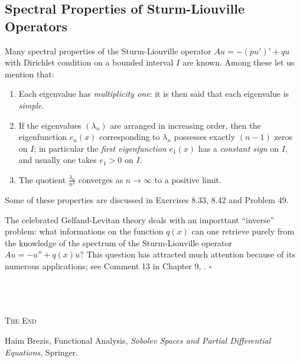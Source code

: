 \documentclass[a4paper,oneside]{article}
\numberwithin{equation}{section}
\begin{document}
\subsection{Spectral Properties of Sturm-Liouville Operators}
Many spectral properties of the Sturm-Liouville operator $Au=-\left(pu'\right)'+qu$ with Dirichlet condition on a bounded interval $I$ are known. Among these let us mention that:
\begin{enumerate}
\item Each eigenvalue has \textit{multiplicity one}: it is then said that each eigenvalue is \textit{simple}.
\item If the eigenvalues $\left(\lambda _n\right)$ are arranged in increasing order, then the eigenfunction $e_n\left(x\right)$ corresponding to $\lambda _n$ possesses exactly $\left(n-1\right)$ zeros on $I$; in particular the \textit{first eigenfunction} $e_1\left(x\right)$ has a \textit{constant sign} on $I$, and usually one takes $e_1>0$ on $I$.
\item The quotient $\frac{\lambda _n}{n^2}$ converges as $n\to \infty$ to a positive limit.
\end{enumerate}

Some of these properties are discussed in Exercises 8.33, 8.42 and Problem 49. 

The celebrated Gelfand-Levitan theory deals with an importtant ``inverse'' problem: what informations on the function $q\left(x\right)$ can one retrieve purely from the knowledge of the spectrum of the Sturm-Liouville operator $Au=-u''+q\left(x\right)u$? This question has attracted much attention because of its numerous applications; see Comment 13 in Chapter 9, \cite{1}. \hfill $\square$\\
\\
\\
\\
\begin{center}
\textsc{The End}
\end{center}
\newpage
\begin{thebibliography}{999}
 Haim Brezis, Functional Analysis, \textit{Sobolev Spaces and Partial Differential Equations}, Springer.
\end{thebibliography}
\end{document}
